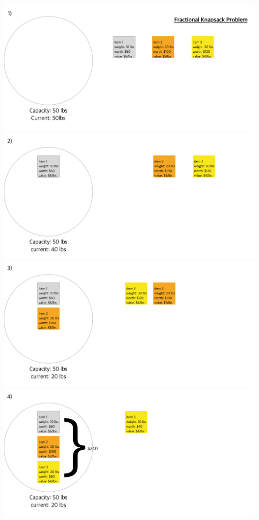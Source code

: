 \documentclass[12pt]{article}
\begin{document}
\begin{enumerate}[1.]
\begin{itemize}
\begin{itemize}
            \begin{center}
            \includegraphics[width=\linewidth]{images/worksheet_2_solution_7.png}
            \includegraphics[width=\linewidth]{images/worksheet_2_solution_8.png}
            \includegraphics[width=\linewidth]{images/worksheet_2_solution_9.png}
            \includegraphics[width=\linewidth]{images/worksheet_2_solution_10.png}
            \end{center}
        \end{itemize}
    \end{itemize}


\end{enumerate}
\end{document}
